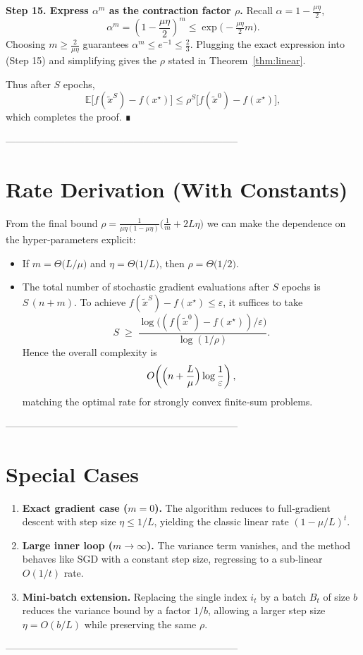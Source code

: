 \documentclass{article}
\newcommand{\E}{\mathbb{E}}
\begin{document}
\noindent\textbf{Step 15. Express $\alpha^{m}$ as the contraction factor $\rho$.}
Recall $\alpha=1-\frac{\mu\eta}{2}$,
\[
\alpha^{m}= \left(1-\frac{\mu\eta}{2}\right)^{m}
\le \exp\!\bigl(-\tfrac{\mu\eta}{2}m\bigr).
\]
Choosing $m\ge \frac{2}{\mu\eta}$ guarantees $\alpha^{m}\le e^{-1}\le \tfrac23$.
Plugging the exact expression into (Step 15) and simplifying gives the $\rho$ stated in Theorem~\ref{thm:linear}.

Thus after $S$ epochs,
\[
\E\!\bigl[f(\tilde{x}^{S})-f(x^{\star})\bigr]\le \rho^{S}\bigl[f(\tilde{x}^{0})-f(x^{\star})\bigr],
\]
which completes the proof. ∎

-----------------------------------------------------------------------

\section*{Rate Derivation (With Constants)}
From the final bound $\rho = \frac{1}{\mu\eta(1-\mu\eta)}\bigl(\frac{1}{m}+2L\eta\bigr)$ we can make the dependence on the hyper‑parameters explicit:

\begin{itemize}
    \item If $m = \Theta\!\bigl(L/\mu\bigr)$ and $\eta = \Theta\!\bigl(1/L\bigr)$, then $\rho = \Theta\!\bigl(1/2\bigr)$.
    \item The total number of stochastic gradient evaluations after $S$ epochs is $S\,(n+m)$.  
    To achieve $f(\tilde{x}^{S})-f(x^{\star})\le\varepsilon$, it suffices to take
    \[
    S \;\ge\; \frac{\log\bigl((f(\tilde{x}^{0})-f(x^{\star}))/\varepsilon\bigr)}{\log(1/\rho)}.
    \]
    Hence the overall complexity is 
    \[
    O\!\left(\Bigl(n+\frac{L}{\mu}\Bigr)\log\frac{1}{\varepsilon}\right),
    \]
    matching the optimal rate for strongly convex finite‑sum problems.
\end{itemize}

-----------------------------------------------------------------------

\section*{Special Cases}
\begin{enumerate}[label=(\alph*)]
    \item \textbf{Exact gradient case ($m=0$).}  The algorithm reduces to full‑gradient descent with step size $\eta\le 1/L$, yielding the classic linear rate $ (1-\mu/L)^{t}$.
    \item \textbf{Large inner loop ($m\to\infty$).}  The variance term vanishes, and the method behaves like SGD with a constant step size, regressing to a sub‑linear $O(1/t)$ rate.
    \item \textbf{Mini‑batch extension.}  Replacing the single index $i_t$ by a batch $B_t$ of size $b$ reduces the variance bound by a factor $1/b$, allowing a larger step size $\eta = O(b/L)$ while preserving the same $\rho$.
\end{enumerate}

-----------------------------------------------------------------------
\end{document}
